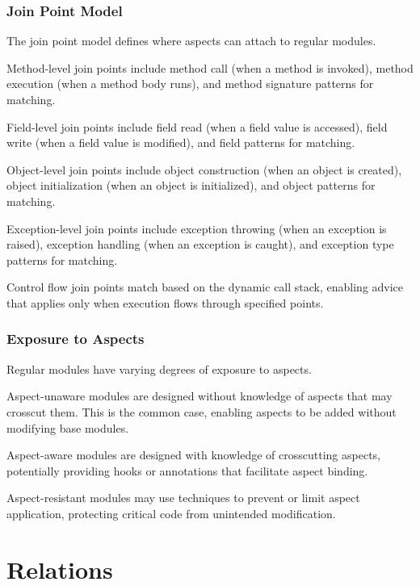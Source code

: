 \documentclass[11pt]{article}
\begin{document}
\subsubsection{Join Point Model}

The join point model defines where aspects can attach to regular modules.

Method-level join points include method call (when a method is invoked), method execution (when a method body runs), and method signature patterns for matching.

Field-level join points include field read (when a field value is accessed), field write (when a field value is modified), and field patterns for matching.

Object-level join points include object construction (when an object is created), object initialization (when an object is initialized), and object patterns for matching.

Exception-level join points include exception throwing (when an exception is raised), exception handling (when an exception is caught), and exception type patterns for matching.

Control flow join points match based on the dynamic call stack, enabling advice that applies only when execution flows through specified points.

\subsubsection{Exposure to Aspects}

Regular modules have varying degrees of exposure to aspects.

Aspect-unaware modules are designed without knowledge of aspects that may crosscut them. This is the common case, enabling aspects to be added without modifying base modules.

Aspect-aware modules are designed with knowledge of crosscutting aspects, potentially providing hooks or annotations that facilitate aspect binding.

Aspect-resistant modules may use techniques to prevent or limit aspect application, protecting critical code from unintended modification.

\section{Relations}
\end{document}
